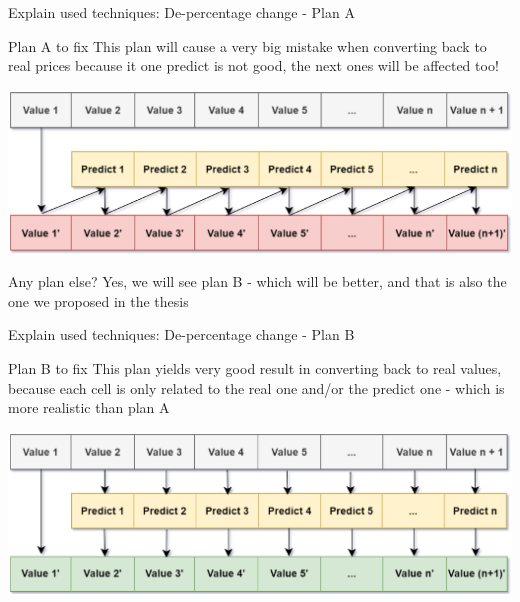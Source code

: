 \documentclass[compress, mathserif, fleqn, 10pt]{beamer}
\begin{document}
	\begin{frame}{Explain used techniques: De-percentage change - Plan A}
		\begin{block}{Plan A to fix}
			This plan will cause a very big mistake when converting back to real prices because it one predict is not good, the next ones will be affected too!
		\end{block}
		\smallskip
		\centerline{\includegraphics[width=\textwidth]{images/dec_percent_bad.eps}}
		\bigskip
		\begin{exampleblock}{Any plan else?}
			Yes, we will see plan B - which will be better, and that is also the one we proposed in the thesis
		\end{exampleblock}
	\end{frame}
	
	\begin{frame}{Explain used techniques: De-percentage change - Plan B}
		\begin{block}{Plan B to fix}
			This plan yields very good result in converting back to real values, because each cell is only related to the real one and/or the predict one - which is more realistic than plan A
		\end{block}
		\smallskip
		\centerline{\includegraphics[width=\textwidth]{images/dec_percent_good.eps}}
	\end{frame}
	
\end{document}
